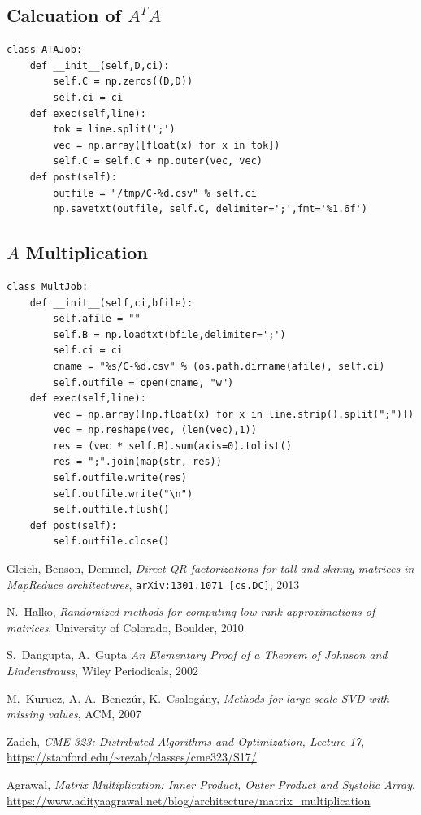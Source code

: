 \documentclass{article}
\begin{document}
\subsection{Calcuation of $A^T A$}

\begin{verbatim}
class ATAJob:
    def __init__(self,D,ci):
        self.C = np.zeros((D,D))
        self.ci = ci
    def exec(self,line):
        tok = line.split(';')
        vec = np.array([float(x) for x in tok])
        self.C = self.C + np.outer(vec, vec)
    def post(self):
        outfile = "/tmp/C-%d.csv" % self.ci
        np.savetxt(outfile, self.C, delimiter=';',fmt='%1.6f')
\end{verbatim}

\subsection{$A$ Multiplication}

\begin{verbatim}
class MultJob:
    def __init__(self,ci,bfile):
        self.afile = ""
        self.B = np.loadtxt(bfile,delimiter=';')
        self.ci = ci
        cname = "%s/C-%d.csv" % (os.path.dirname(afile), self.ci)
        self.outfile = open(cname, "w")        
    def exec(self,line):        
        vec = np.array([np.float(x) for x in line.strip().split(";")])
        vec = np.reshape(vec, (len(vec),1))
        res = (vec * self.B).sum(axis=0).tolist()  
        res = ";".join(map(str, res))
        self.outfile.write(res)
        self.outfile.write("\n")
        self.outfile.flush()
    def post(self):
        self.outfile.close()
\end{verbatim}



  

\begin{thebibliography}{1}

Gleich, Benson, Demmel, \emph{Direct QR factorizations for tall-and-skinny
  matrices in MapReduce architectures}, {\tt arXiv:1301.1071 [cs.DC]}, 2013

N.~Halko, \emph{Randomized methods for computing low-rank approximations of
  matrices}, University of Colorado, Boulder, 2010

S.~Dangupta, A.~Gupta \emph{An Elementary Proof of a Theorem of Johnson and
  Lindenstrauss}, Wiley Periodicals, 2002

M.~Kurucz, A. A.~Benczúr, K.~Csalogány, \emph{Methods for large scale SVD with
missing values}, ACM, 2007

Zadeh, \emph{CME 323: Distributed Algorithms and Optimization, Lecture 17}, 
\url{https://stanford.edu/~rezab/classes/cme323/S17/}

Agrawal, \emph{Matrix Multiplication: Inner Product, Outer Product and Systolic Array},
\url{https://www.adityaagrawal.net/blog/architecture/matrix_multiplication}
  
\end{thebibliography}
\end{document}
